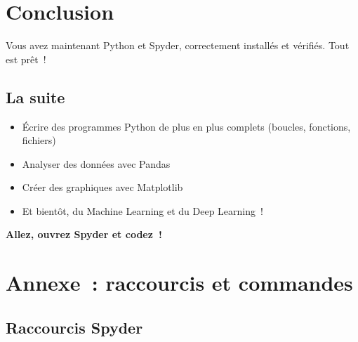 \documentclass[12pt,a4paper]{article}
\begin{document}
	\section{Conclusion}
	
	Vous avez maintenant Python et Spyder, correctement installés et vérifiés. Tout est prêt~!
	
	\subsection{La suite}
	
	\begin{itemize}
		\item Écrire des programmes Python de plus en plus complets (boucles, fonctions, fichiers)
		\item Analyser des données avec Pandas
		\item Créer des graphiques avec Matplotlib
		\item Et bientôt, du Machine Learning et du Deep Learning~!
	\end{itemize}
	
	\begin{center}
	\end{center}
	
	\vspace{1cm}
	\begin{center}
		\LARGE \textbf{Allez, ouvrez Spyder et codez~!}
	\end{center}
	
	\section*{Annexe~: raccourcis et commandes}
	
	\subsection*{Raccourcis Spyder}
	
\end{document}
